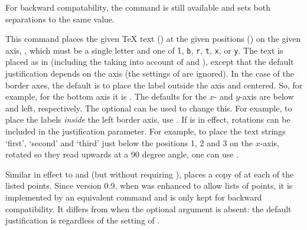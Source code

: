 \documentclass[letterpaper]{article}
\begin{document}
For backward compatability, the command  is still
available and sets both separations to the same value.

\begin{cd}
%
\end{cd}

This command places the given \TeX{} text () at the given
positions () on the given axis, , which must be a
single letter and one of \texttt{l}, \texttt{b}, \texttt{r}, \texttt{t},
\texttt{x}, or \texttt{y}. The text is placed as in 
(including the taking into account of  and
), except that the default justification depends on the
axis (the settings of  are ignored). In the case of
the border axes, the default is to place the label outside the axis and
centered. So, for example, for the bottom axis it is . The
defaults for the $x$- and $y$-axis are below and left, respectively. The
optional  can be used to change this. For example, to place
the labels \emph{inside} the left border axis, use . If
 is in effect, rotations can be included in the
justification parameter. For example, to place the text strings
`first', `second' and `third' just below the positions 1, 2 and 3
on the $x$-axis, rotated so they read upwards at a 90 degree angle, one
can use .

\begin{cd}
%
\end{cd}

Similar in effect to  and  (but without
requiring \MF{}),  places a copy of  at each of
the listed points. Since version 0.9, when  was enhanced to
allow lists of points, it is implemented by an equivalent 
command and is only kept for backward compatibility. It differs from
 when the optional argument is absent: the default
justification is  regardless of the setting of
.

\begin{cd}
%
\end{cd}
\end{document}
